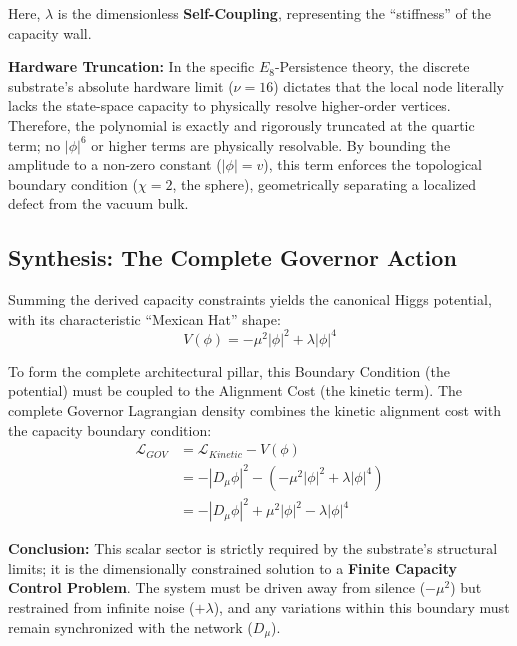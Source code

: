 \begin{enumerate}
    Here, $\lambda$ is the dimensionless \textbf{Self-Coupling}, representing the ``stiffness'' of the capacity wall. 
    
    \textbf{Hardware Truncation:} In the specific $E_8$-Persistence theory, the discrete substrate's absolute hardware limit ($\nu=16$) dictates that the local node literally lacks the state-space capacity to physically resolve higher-order vertices. Therefore, the polynomial is exactly and rigorously truncated at the quartic term; no $|\phi|^6$ or higher terms are physically resolvable. By bounding the amplitude to a non-zero constant ($|\phi| = v$), this term enforces the topological boundary condition ($\chi=2$, the sphere), geometrically separating a localized defect from the vacuum bulk.
\end{enumerate}

\subsection{Synthesis: The Complete Governor Action}

Summing the derived capacity constraints yields the canonical Higgs potential, with its characteristic ``Mexican Hat'' shape:
\begin{equation}
    \label{eq:higgs_potential}
    V(\phi) = -\mu^2|\phi|^2 + \lambda|\phi|^4
\end{equation}

To form the complete architectural pillar, this Boundary Condition (the potential) must be coupled to the Alignment Cost (the kinetic term). The complete Governor Lagrangian density combines the kinetic alignment cost with the capacity boundary condition:
\begin{equation}
\begin{split}
    \mathcal{L}_{GOV} &= \mathcal{L}_{Kinetic} - V(\phi) \\
        &= -|D_\mu \phi|^2 - \left( -\mu^2|\phi|^2 + \lambda|\phi|^4 \right) \\
        &= -|D_\mu\phi|^2 + \mu^2|\phi|^2 - \lambda|\phi|^4
\end{split}
\end{equation}

\textbf{Conclusion:} This scalar sector is strictly required by the substrate's structural limits; it is the dimensionally constrained solution to a \textbf{Finite Capacity Control Problem}. The system must be driven away from silence ($-\mu^2$) but restrained from infinite noise ($+\lambda$), and any variations within this boundary must remain synchronized with the network ($D_\mu$).

